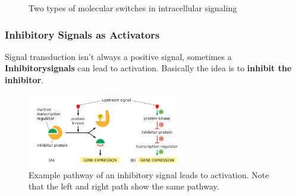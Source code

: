 \documentclass[../main.tex]{subfiles}
\begin{document}
\begin{figure}[h]
	\centering
	\hfill
	\caption{Two types of molecular switches in intracellular signaling}
\end{figure}
 


\subsubsection{Inhibitory Signals as Activators}

Signal transduction isn't always a positive signal, sometimes a \textbf{\gls{Inhibitorysignals}} can lead to activation. Basically the idea is to \textbf{inhibit the inhibitor}.
\begin{figure}[H]
	\centering
	\includegraphics[width=0.6\textwidth]{inhib_ex}
	\caption{Example pathway of an inhibitory signal leads to activation. Note that the left and right path show the same pathway. }
\end{figure}
\end{document}
